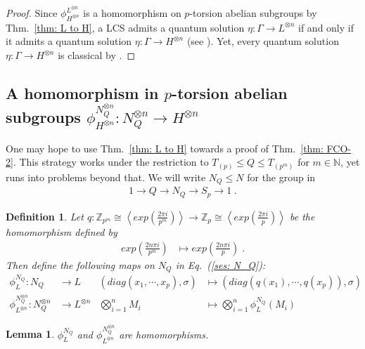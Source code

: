 \documentclass[aps,pra,letterpaper,onrcolumn,nofootinbib,notitlepage,longbibliography]{revtex4-1}
\newtheorem{lemma}{Lemma}
\newtheorem{definition}{Definition}
\newcommand{\mf}[1]{#1}
\newcommand{\ra}{\ensuremath{\rightarrow}}
\newcommand{\zz}{\mathbb Z}
\begin{document}
\begin{proof}
    Since $\phi^{L^{\otimes n}}_{H^{\otimes n}}$ is a homomorphism on $p$-torsion abelian subgroups by Thm.~\ref{thm: L to H}, a LCS admits a quantum solution $\eta:\Gamma\ra L^{\otimes n}$ if and only if it admits a quantum solution $\eta:\Gamma \ra H^{\otimes n}$ (see \cite[Cor.~4]{FrembsChungOkay2022}). Yet, every quantum solution $\eta:\Gamma\ra H^{\otimes n}$ is classical by \cite[Thm.~2]{QassimWallman2020}.
\end{proof}



\subsection{A homomorphism in $p$-torsion abelian subgroups $\phi^{N_Q^{\otimes n}}_{H^{\otimes n}}:N_Q^{\otimes n}\ra H^{\otimes n}$}

\mf{One may hope to use Thm.~\ref{thm: L to H} towards a proof of Thm.~\ref{thm: FCO-2}. This strategy works under the restriction to $T_{(p)}\leq Q\leq T_{(p^m)}$ for $m\in\mathbb{N}$, yet runs into problems beyond that.} We will write $N_Q\leq N$ for the group in
\begin{align}\label{ses: N_Q}
    1 \ra Q \ra N_Q \ra S_p \ra 1\; .
\end{align}

\begin{definition}\label{def: q homomorphism}
    Let $q:\zz_{p^m}\cong \left\langle exp\left(\frac{2\pi i}{p^m}\right)\right\rangle \to \zz_p\cong \left\langle exp\left(\frac{2\pi i}{p}\right)\right\rangle$ be the homomorphism defined by
    \begin{align*}
        exp\left(\frac{2n\pi i}{p^m}\right)&\mapsto exp\left(\frac{2n\pi i}{p}\right)\; .
    \end{align*}
    Then define the following maps on $N_Q$ in Eq.~(\ref{ses: N_Q}):
    \begin{align*}
        \phi^{N_Q}_{L}:N_Q&\to L &
        (diag(x_1,\cdots,x_p),\sigma)&\mapsto (diag(q(x_1),\cdots,q(x_p)),\sigma) \\
        \phi^{N_Q^{\otimes n}}_{L^{\otimes n}}:N_Q^{\otimes n}&\to L^{\otimes n} &
        \bigotimes_{i=1}^n M_i&\mapsto \bigotimes_{i=1}^n \phi^{N_Q}_{L}(M_i)
    \end{align*}
\end{definition}

\begin{lemma}\label{lm: reduction to L^n}
    $\phi^{N_Q}_{L}$ and $\phi^{N_Q^{\otimes n}}_{L^{\otimes n}}$ are homomorphisms.
\end{lemma}
\end{document}
